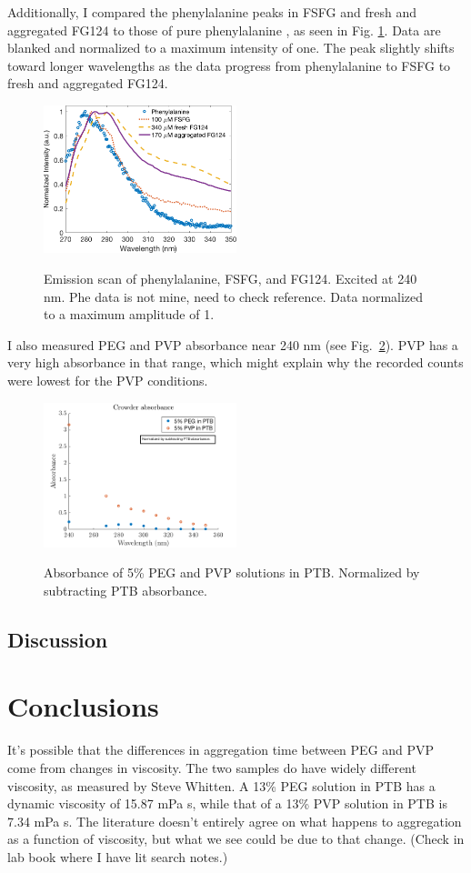 Additionally, I compared the phenylalanine peaks in FSFG and fresh and aggregated FG124 to those of pure phenylalanine \cite{zotero-5177}, as seen in Fig. \ref{fig:phe-comparison}.  Data are blanked and normalized to a maximum intensity of one.  The peak slightly shifts toward longer wavelengths as the data progress from phenylalanine to FSFG to fresh and aggregated FG124.
\begin{figure}
\caption{Emission scan of phenylalanine, FSFG, and FG124. Excited at 240 nm.  Phe data is not mine, need to check reference. Data normalized to a maximum amplitude of 1.}
\centering
\includegraphics[width=0.5\textwidth]{figs/ch05/phe-comparison}
\label{fig:phe-comparison}
\end{figure}
I also measured PEG and PVP absorbance near 240 nm (see Fig.~\ref{fig:crowder-absorbance}).  PVP has a very high absorbance in that range, which might explain why the recorded counts were lowest for the PVP conditions.
\begin{figure}
\caption{Absorbance of 5\% PEG and PVP solutions in PTB.  Normalized by subtracting PTB absorbance.}
\centering
\includegraphics[width=0.5\textwidth]{figs/ch05/crowder-absorbance}
\label{fig:crowder-absorbance}
\end{figure}
\subsection{Discussion}

\section{Conclusions}

It's possible that the differences in aggregation time between PEG and PVP come from changes in viscosity.  The two samples do have widely different viscosity, as measured by Steve Whitten.  A 13\% PEG solution in PTB has a dynamic viscosity of 15.87 mPa s, while that of a 13\% PVP solution in PTB is 7.34 mPa s.  The literature doesn't entirely agree on what happens to aggregation as a function of viscosity, but what we see could be due to that change.  (Check in lab book where I have lit search notes.)
